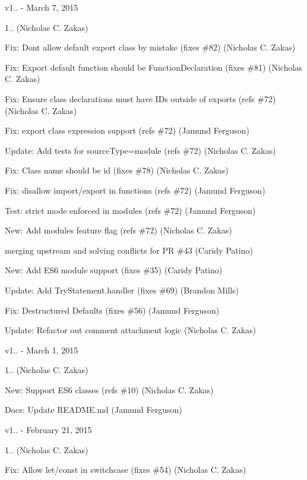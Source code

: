 v1.. -\/ March 7, 2015


\begin{DoxyItemize}
\item 1.. (Nicholas C. Zakas)
\item Fix\+: Don\textquotesingle{}t allow default export class by mistake (fixes \#82) (Nicholas C. Zakas)
\item Fix\+: Export default function should be Function\+Declaration (fixes \#81) (Nicholas C. Zakas)
\item Fix\+: Ensure class declarations must have IDs outside of exports (refs \#72) (Nicholas C. Zakas)
\item Fix\+: export class expression support (refs \#72) (Jamund Ferguson)
\item Update\+: Add tests for source\+Type=module (refs \#72) (Nicholas C. Zakas)
\item Fix\+: Class name should be id (fixes \#78) (Nicholas C. Zakas)
\item Fix\+: disallow import/export in functions (refs \#72) (Jamund Ferguson)
\item Test\+: strict mode enforced in modules (refs \#72) (Jamund Ferguson)
\item New\+: Add modules feature flag (refs \#72) (Nicholas C. Zakas)
\item merging upstream and solving conflicts for PR \#43 (Caridy Patino)
\item New\+: Add ES6 module support (fixes \#35) (Caridy Patino)
\item Update\+: Add Try\+Statement.\+handler (fixes \#69) (Brandon Mills)
\item Fix\+: Destructured Defaults (fixes \#56) (Jamund Ferguson)
\item Update\+: Refactor out comment attachment logic (Nicholas C. Zakas)
\end{DoxyItemize}

v1.. -\/ March 1, 2015


\begin{DoxyItemize}
\item 1.. (Nicholas C. Zakas)
\item New\+: Support ES6 classes (refs \#10) (Nicholas C. Zakas)
\item Docs\+: Update README.\+md (Jamund Ferguson)
\end{DoxyItemize}

v1.. -\/ February 21, 2015


\begin{DoxyItemize}
\item 1.. (Nicholas C. Zakas)
\item Fix\+: Allow let/const in switchcase (fixes \#54) (Nicholas C. Zakas)
\end{DoxyItemize}

